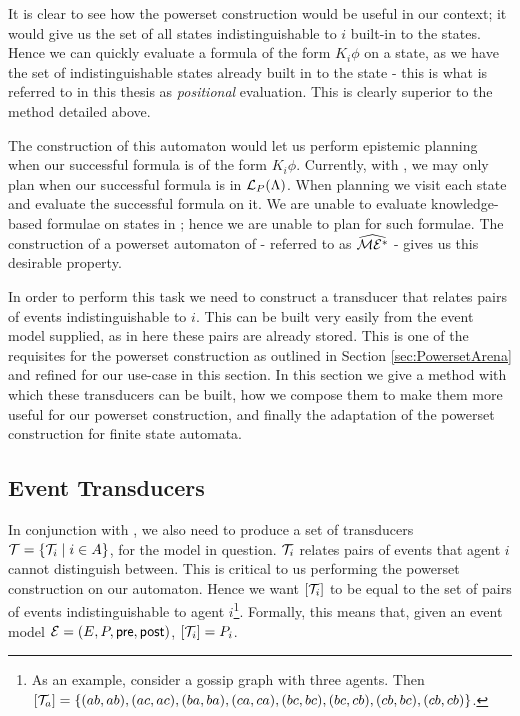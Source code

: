 \documentclass[10pt, a4paper]{report}
\begin{document}
It is clear to see how the powerset construction would be useful in our context;
it would give us the set of all states indistinguishable to $i$ built-in to the
states. Hence we can quickly evaluate a formula of the form $K_i \phi$ on a
state, as we have the set of indistinguishable states already built in to the
state - this is what is referred to in this thesis as \emph{positional}
evaluation. This is clearly superior to the method detailed above. 

The construction of this automaton would let us perform epistemic planning when
our successful formula is of the form $K_i \phi$. Currently, with \mestar, we
may only plan when our successful formula is in $\mathcal{L}_P(\Lambda)$. When
planning we visit each state and evaluate the successful formula on it. We are
unable to evaluate knowledge-based formulae on states in \mestar; hence we are
unable to plan for such formulae. The construction of a powerset automaton of
\mestar - referred to as $\widehat{\mathcal{ME^\ast}}$ - gives us this desirable property.

In order to perform this task we need to construct a transducer that relates
pairs of events indistinguishable to $i$. This can be built very easily from the
event model supplied, as in here these pairs are already stored. This is one of
the requisites for the powerset construction as outlined in Section
\ref{sec:PowersetArena} and refined for our use-case in this section. In this
section we give a method with which these transducers can be built, how we
compose them to make them more useful for our powerset construction, and finally
the adaptation of the powerset construction for finite state automata.

\subsection{Event Transducers}

In conjunction with \mestar, we also need to produce a set of transducers
$\mathcal{T} = \{\mathcal{T}_i \mid i \in A\}$, for the model in question. $\mathcal{T}_i$
relates pairs of events that agent $i$ cannot distinguish between. This is
critical to us performing the powerset construction on our \mestar automaton.
Hence we want $\left[ \mathcal{T}_i \right]$ to be equal to the set of pairs of events
indistinguishable to agent $i$\footnote{As an example, consider a gossip graph
  with three agents. Then $\left[ \mathcal{T}_a \right] = \left\{ (ab, ab), (ac, ac),
    (ba, ba), (ca, ca), (bc, bc), (bc, cb), (cb, bc), (cb, cb) \right\} $.}.
Formally, this means that, given an event model $\mathcal{E} = (E, P, \textsf{pre}, \textsf{post})$,
$[\mathcal{T}_i] = P_i$. 
\end{document}
